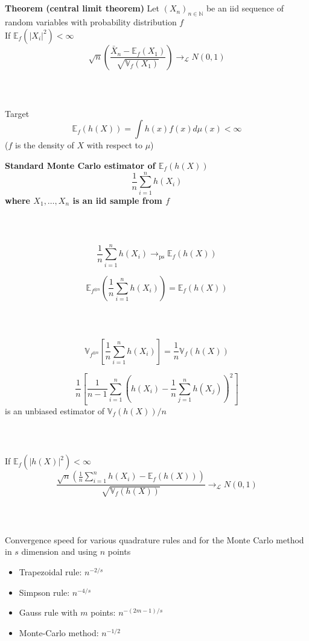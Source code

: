 \documentclass[notes,professionalfont,11pt,usenames,dvipsnames]{beamer}
\renewcommand{\mathcal}{\mathscr}
\renewcommand{\mathcal}{\mathscr}
\newcommand{\E}{\mathbb{E}}
\newcommand{\V}{\mathbb{V}}
\newcommand\justify{\rightskip0pt \leftskip0pt}
\newenvironment{slide}
{\begin{frame}[environment=slide]
\frametitle{\insertsection \\ \insertsubsection}\justify\setlength{\parskip}{0.5cm}\vspace{-0.5cm}}
{\end{frame}}
\begin{document}
\begin{slide}

{\bf Theorem (central limit theorem)}
Let $(X_n)_{n\in\mathbb{N}}$ be an iid sequence of random variables with probability distribution $f$ \\
If $\E_f(|X_i|^2)<\infty$
$$
\sqrt{n}\left(\frac{\bar X_n - \E_f(X_1)}{\sqrt{\V_f(X_1)}}\right)\longrightarrow_{\mathcal{L}} N(0,1)
$$

\end{slide}

\begin{slide}

Target
$$
\E_f(h(X))=\int h(x)f(x)d\mu(x)<\infty
$$
($f$ is the density of $X$ with respect to $\mu$)


{\bf Standard Monte Carlo estimator of $\E_f(h(X))$
$$
\frac{1}{n}\sum_{i=1}^n h(X_i)
$$
where $X_1,\ldots,X_n$ is an iid sample from $f$}



\end{slide}

\begin{slide}

$$
\frac{1}{n}\sum_{i=1}^n h(X_i)\longrightarrow_{\mbox{ps}} \E_f(h(X))
$$


$$
\E_{f^{\otimes n}}\left(\frac{1}{n}\sum_{i=1}^n h(X_i)\right)=\E_f(h(X))
$$

\end{slide}

\begin{slide}

$$
\V_{f^{\otimes n}}\left[\frac{1}{n}\sum_{i=1}^nh(X_i)\right]=\frac{1}{n}\V_f(h(X))
$$


$$
\frac{1}{n}\left[\frac{1}{n-1}\sum_{i=1}^n\left(h(X_i)-\frac{1}{n}\sum_{j=1}^nh(X_j)\right)^2\right]
$$
is an unbiased estimator of $\V_f(h(X))\big/ n$

\end{slide}

\begin{slide}

If $\E_f(|h(X)|^2)<\infty$
$$
\frac{\sqrt{n}\left(\frac{1}{n}\sum_{i=1}^n h(X_i)-\E_f(h(X))\right)}{\sqrt{\V_f(h(X))}}
\longrightarrow_{\mathcal{L}} N(0,1)
$$

\end{slide}

\begin{slide}

Convergence speed for various quadrature rules and for the Monte Carlo method 
in $s$ dimension and using $n$ points


\begin{itemize}
\item Trapezoidal rule: $n^{-2/s}$
\item Simpson rule: $n^{-4/s}$
\item Gauss rule with $m$ points: $n^{-(2m-1)/s}$
\item Monte-Carlo method: $n^{-1/2}$
\end{itemize}

\end{slide}
\end{document}

